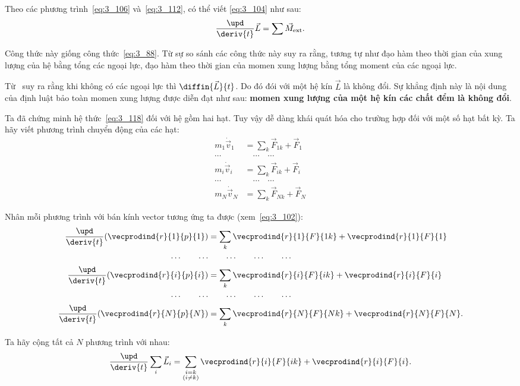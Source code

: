 Theo các phương trình~\eqref{eq:3_106} và~\eqref{eq:3_112}, có thể viết \eqref{eq:3_104} như sau:
\begin{equation}\label{eq:3_118}
\frac{\upd}{\deriv{t}}\vec{L} = \sum\vec{M}_{\text{ext}}.
\end{equation}

\noindent
Công thức này giống công thức~\eqref{eq:3_88}. Từ sự so sánh các công thức này suy ra rằng, tương tự như đạo hàm theo thời gian của xung lượng của hệ bằng tổng các ngoại lực, đạo hàm theo thời gian của momen xung lượng bằng tổng moment của các ngoại lực. 

Từ~ suy ra rằng khi không có các ngoại lực thì $\diffin{\vec{L}}{t}$. Do đó đói với một hệ kín $\vec{L}$ là không đổi. Sự khẳng định này là nội dung của định luật bảo toàn momen xung lượng được diễn đạt như sau: \textbf{momen xung lượng của một hệ kín các chất đểm là không đổi}.

Ta đã chứng minh hệ thức~\eqref{eq:3_118} đối với hệ gồm hai hạt. Tuy vậy dễ dàng khái quát hóa cho trường hợp đối với một số hạt bất kỳ. Ta hãy viết phương trình chuyển động của các hạt:
\begin{align*}
m_1\dot{\vec{v}}_1 &= \sum_k \vec{F}_{1k} + \vec{F}_1\\
\cdots & \quad\cdots \quad\cdots\\
m_i\dot{\vec{v}}_i &= \sum_k \vec{F}_{ik} + \vec{F}_i\\
\cdots & \quad\cdots \quad\cdots\\
m_N\dot{\vec{v}}_N &= \sum_k \vec{F}_{Nk} + \vec{F}_N
\end{align*}

\noindent
Nhân mỗi phương trình với bán kính vector tương ứng ta được (xem~\eqref{eq:3_102}):
\begin{align*}
\frac{\upd}{\deriv{t}}(\vecprodind{r}{1}{p}{1}) &= \sum_k \vecprodind{r}{1}{F}{1k} + \vecprodind{r}{1}{F}{1}\\
\cdots\quad\quad\cdots & \quad\quad\cdots \quad\quad\cdots \quad\quad\cdots\\
\frac{\upd}{\deriv{t}}(\vecprodind{r}{i}{p}{i}) &= \sum_k \vecprodind{r}{i}{F}{ik} + \vecprodind{r}{i}{F}{i}\\
\cdots\quad\quad\cdots & \quad\quad\cdots \quad\quad\cdots \quad\quad\cdots\\
\frac{\upd}{\deriv{t}}(\vecprodind{r}{N}{p}{N}) &= \sum_k \vecprodind{r}{N}{F}{Nk} + \vecprodind{r}{N}{F}{N}.
\end{align*}

\noindent
Ta hãy cộng tất cả $N$ phương trình với nhau:
\begin{equation*}
\frac{\upd}{\deriv{t}} \sum_i \vec{L}_i = \sum_{\substack{i=k\\(i\neq k)}} \vecprodind{r}{i}{F}{ik} + \vecprodind{r}{i}{F}{i}.
\end{equation*}

